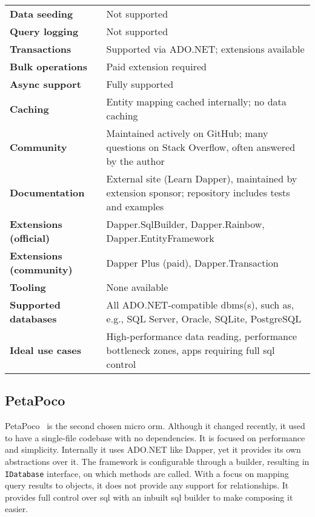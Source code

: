{\begin{landscape}
\begin{table}[p]
\begin{tabular}{
>{\raggedright\arraybackslash}p{40.00mm}
>{\arraybackslash}p{150.00mm}
}
\textbf{Data seeding} & Not supported \\
\textbf{Query logging} & Not supported \\
\textbf{Transactions} & Supported via ADO.NET; extensions available \\
\textbf{Bulk operations} & Paid extension required \\
\textbf{Async support} & Fully supported \\
\textbf{Caching} & Entity mapping cached internally; no data caching \\
\textbf{Community} & Maintained actively on GitHub; many questions on Stack Overflow, often answered by the author \\
\textbf{Documentation} & External site (Learn Dapper), maintained by extension sponsor; repository includes tests and examples \\
\textbf{Extensions (official)} & Dapper.SqlBuilder, Dapper.Rainbow, Dapper.EntityFramework \\
\textbf{Extensions (community)} & Dapper Plus (paid), Dapper.Transaction \\
\textbf{Tooling} & None available \\
\textbf{Supported databases} & All ADO.NET-compatible \acrshort{dbms}(s), such as, e.g., SQL Server, Oracle, SQLite, PostgreSQL \\
\textbf{Ideal use cases} & High-performance data reading, performance bottleneck zones, apps requiring full \acrshort{sql} control \\
\bottomrule
\end{tabular}
\end{table}
\end{landscape}
}

\subsection{PetaPoco}
\label{sec:feat_petapoco}

PetaPoco~\cite{PetaPoco} is the second chosen micro \acrshort{orm}. Although it changed recently, it used to have a single-file codebase with no dependencies. It is focused on performance and simplicity. Internally it uses ADO.NET like Dapper, yet it provides its own abstractions over it. The framework is configurable through a builder, resulting in \texttt{IDatabase} interface, on which methods are called. With a focus on mapping query results to objects, it does not provide any support for relationships. It provides full control over \acrshort{sql} with an inbuilt \acrshort{sql} builder to make composing it easier. 

